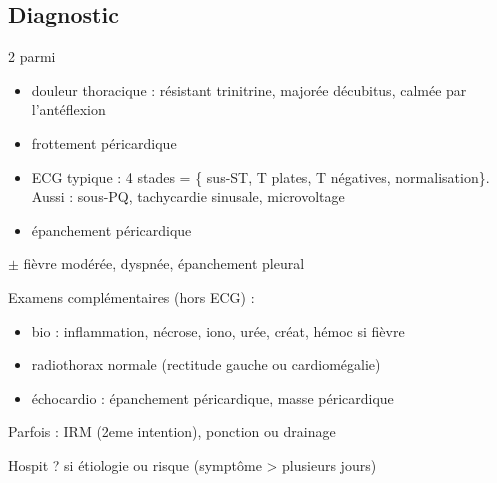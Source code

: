 \documentclass{article}
\begin{document}
\subsection{Diagnostic}
2 parmi
\begin{itemize}
  \item douleur thoracique : résistant trinitrine, majorée décubitus, calmée par
    l'antéflexion
  \item frottement péricardique
  \item ECG typique : 4 stades = \{ sus-ST, T plates, T négatives,
    normalisation\}. Aussi : sous-PQ, tachycardie sinusale, microvoltage
  \item épanchement péricardique
\end{itemize}
$\pm$ fièvre modérée, dyspnée, épanchement pleural

Examens complémentaires (hors ECG) :
\begin{itemize}
  \item bio : inflammation, nécrose, iono, urée, créat, hémoc si fièvre
  \item radiothorax normale (rectitude gauche ou cardiomégalie)
  \item échocardio : épanchement péricardique, masse péricardique
\end{itemize}
Parfois : IRM (2eme intention), ponction ou drainage

Hospit ? si étiologie ou risque (symptôme > plusieurs jours)
\end{document}
